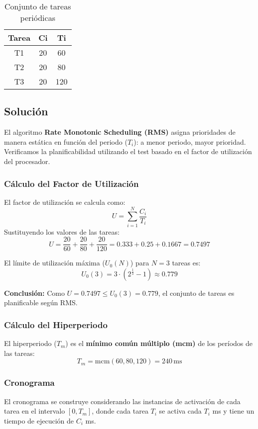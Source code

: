 \documentclass[a4paper,12pt]{article}
\begin{document}
\begin{table}[H]
\centering
\begin{tabular}{|c|c|c|}
\hline
\textbf{Tarea} & \textbf{Ci} & \textbf{Ti} \\ \hline
T1 & 20 & 60 \\ \hline
T2 & 20 & 80 \\ \hline
T3 & 20 & 120 \\ \hline
\end{tabular}
\caption{Conjunto de tareas periódicas}
\end{table}

\subsection{Solución}
El algoritmo \textbf{Rate Monotonic Scheduling (RMS)} asigna prioridades de manera estática en función del periodo (\(T_i\)): a menor periodo, mayor prioridad. Verificamos la planificabilidad utilizando el test basado en el factor de utilización del procesador.

\subsubsection{Cálculo del Factor de Utilización}
El factor de utilización se calcula como:
\[
U = \sum_{i=1}^N \frac{C_i}{T_i}
\]
Sustituyendo los valores de las tareas:
\[
U = \frac{20}{60} + \frac{20}{80} + \frac{20}{120} = 0.333 + 0.25 + 0.1667 = 0.7497
\]

El límite de utilización máxima (\(U_0(N)\)) para \(N = 3\) tareas es:
\[
U_0(3) = 3 \cdot (2^{\frac{1}{3}} - 1) \approx 0.779
\]

\textbf{Conclusión:} Como \(U = 0.7497 \leq U_0(3) = 0.779\), el conjunto de tareas es planificable según RMS.

\subsubsection{Cálculo del Hiperperiodo}
El hiperperiodo (\(T_m\)) es el \textbf{mínimo común múltiplo (mcm)} de los períodos de las tareas:
\[
T_m = \text{mcm}(60, 80, 120) = 240 \, \text{ms}
\]

\subsubsection{Cronograma}
El cronograma se construye considerando las instancias de activación de cada tarea en el intervalo \([0, T_m]\), donde cada tarea \(T_i\) se activa cada \(T_i\) ms y tiene un tiempo de ejecución de \(C_i\) ms.
\end{document}
